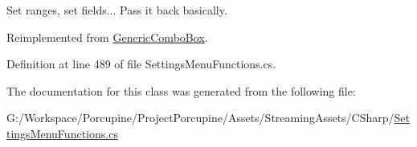 Set ranges, set fields... Pass it back basically. 



Reimplemented from \hyperlink{class_generic_combo_box_ae1800a7c68d3af046a2b147e117437ff}{Generic\+Combo\+Box}.



Definition at line 489 of file Settings\+Menu\+Functions.\+cs.



The documentation for this class was generated from the following file\+:\begin{DoxyCompactItemize}
\item 
G\+:/\+Workspace/\+Porcupine/\+Project\+Porcupine/\+Assets/\+Streaming\+Assets/\+C\+Sharp/\hyperlink{_settings_menu_functions_8cs}{Settings\+Menu\+Functions.\+cs}\end{DoxyCompactItemize}

